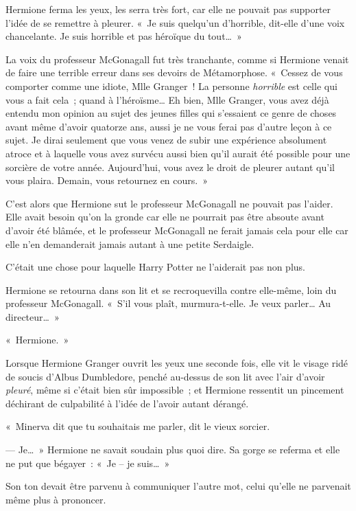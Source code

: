 Hermione ferma les yeux, les serra très fort, car elle ne pouvait pas supporter l'idée de se remettre à pleurer. «~Je suis quelqu'un d'horrible, dit-elle d'une voix chancelante. Je suis horrible et pas héroïque du tout…~»

La voix du professeur McGonagall fut très tranchante, comme si Hermione venait de faire une terrible erreur dans ses devoirs de Métamorphose. «~Cessez de vous comporter comme une idiote, Mlle Granger~! La personne \emph{horrible} est celle qui vous a fait cela~; quand à l'héroïsme… Eh bien, Mlle Granger, vous avez déjà entendu mon opinion au sujet des jeunes filles qui s'essaient ce genre de choses avant même d'avoir quatorze ans, aussi je ne vous ferai pas d'autre leçon à ce sujet. Je dirai seulement que vous venez de subir une expérience absolument atroce et à laquelle vous avez survécu aussi bien qu'il aurait été possible pour une sorcière de votre année. Aujourd'hui, vous avez le droit de pleurer autant qu'il vous plaira. Demain, vous retournez en cours.~»

C'est alors que Hermione sut le professeur McGonagall ne pouvait pas l'aider. Elle avait besoin qu'on la gronde car elle ne pourrait pas être absoute avant d'avoir été blâmée, et le professeur McGonagall ne ferait jamais cela pour elle car elle n'en demanderait jamais autant à une petite Serdaigle.

C'était une chose pour laquelle Harry Potter ne l'aiderait pas non plus.

Hermione se retourna dans son lit et se recroquevilla contre elle-même, loin du professeur McGonagall. «~S'il vous plaît, murmura-t-elle. Je veux parler… Au directeur…~»

\later

«~Hermione.~»

Lorsque Hermione Granger ouvrit les yeux une seconde fois, elle vit le visage ridé de soucis d'Albus Dumbledore, penché au-dessus de son lit avec l'air d'avoir \emph{pleuré}, même si c'était bien sûr impossible~; et Hermione ressentit un pincement déchirant de culpabilité à l'idée de l'avoir autant dérangé.

«~Minerva dit que tu souhaitais me parler, dit le vieux sorcier.

--- Je…~» Hermione ne savait soudain plus quoi dire. Sa gorge se referma et elle ne put que bégayer~: «~Je -- je suis…~»

Son ton devait être parvenu à communiquer l'autre mot, celui qu'elle ne parvenait même plus à prononcer.

